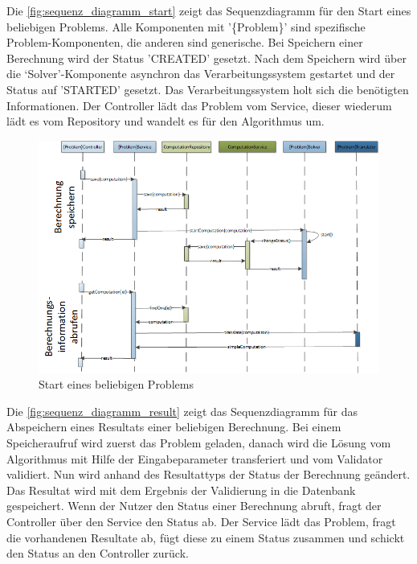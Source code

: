 \FloatBarrier
\newpage

Die \autoref{fig:sequenz_diagramm_start} zeigt das Sequenzdiagramm für den Start eines beliebigen Problems. Alle Komponenten mit '\{Problem\}' sind spezifische Problem-Komponenten, 
die anderen sind generische. Bei Speichern einer Berechnung wird der Status 'CREATED' gesetzt. Nach dem Speichern wird über die `Solver'-Komponente asynchron das Verarbeitungssystem 
gestartet und der Status auf 'STARTED' gesetzt. Das Verarbeitungssystem holt sich die benötigten Informationen. Der Controller lädt das Problem vom Service, dieser wiederum lädt es vom 
Repository und wandelt es für den Algorithmus um.

\begin{figure}[h]
\centering
\includegraphics[scale=0.74]{images/visio/sequenz_diagramm_start.png}
\caption[Start eines beliebigen Problems]{Start eines beliebigen Problems \selfmade{}}
\label{fig:sequenz_diagramm_start}
\end{figure}

\newpage

Die \autoref{fig:sequenz_diagramm_result} zeigt das Sequenzdiagramm für das Abspeichern eines Resultats einer beliebigen Berechnung. Bei einem Speicheraufruf wird zuerst das Problem 
geladen, danach wird die Lösung vom Algorithmus mit Hilfe der Eingabeparameter transferiert und vom Validator validiert. Nun wird anhand des Resultattyps der Status der Berechnung 
geändert. Das Resultat wird mit dem Ergebnis der Validierung in die Datenbank gespeichert. Wenn der Nutzer den Status einer Berechnung abruft, fragt der Controller über den 
Service den Status ab. Der Service lädt das Problem, fragt die vorhandenen Resultate ab, fügt diese zu einem Status zusammen und schickt den Status an den Controller zurück.

